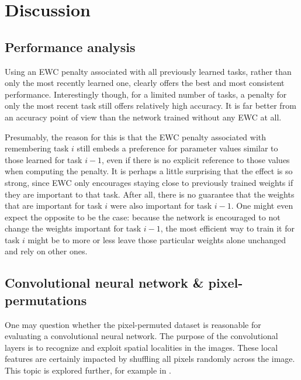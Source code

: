 \documentclass{article}
\begin{document}
    \section*{Discussion}
        \subsection*{Performance analysis}
            Using an EWC penalty associated with all previously learned 
            tasks, rather than only the most recently learned one, clearly offers 
            the best and most consistent performance. Interestingly though, for 
            a limited number of tasks, a penalty for only the most recent task 
            still offers relatively high accuracy. It is far better from an 
            accuracy point of view than the network trained without any EWC at all.

            Presumably, the reason for this is that the EWC penalty associated 
            with remembering task $i$ still embeds a preference for parameter 
            values similar to those learned for task $i-1$, even if there is no 
            explicit reference to those values when computing the penalty. 
            It is perhaps a little surprising that the effect is so strong, 
            since EWC only encourages staying close to previously trained weights
            if they are important to that task. After all, there is no guarantee that 
            the weights that are important for task $i$ were also important for 
            task $i-1$. One might even expect the opposite to be the case: 
            because the network is encouraged to not change the weights 
            important for task $i-1$, the most efficient way to train it for 
            task $i$ might be to more or less leave those particular weights alone 
            unchanged and rely on other ones.

        \subsection*{Convolutional neural network \& pixel-permutations}
            One may question whether the pixel-permuted dataset is reasonable
            for evaluating a convolutional neural network. The purpose of the 
            convolutional layers is to recognize and exploit spatial localities 
            in the images. These local features are certainly impacted by shuffling 
            all pixels randomly across the image. This topic is explored further,
            for example in \cite{ivan2019convolutional}.
            
\end{document}

